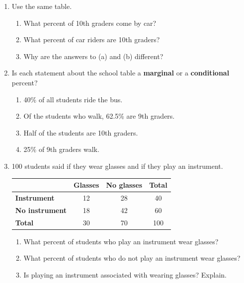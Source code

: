 \documentclass[11pt]{article}
\begin{document}
\begin{enumerate}
\item Use the same table.
\begin{enumerate}[itemsep=1.4em]
  \item What percent of 10th graders come by car? 
  \item What percent of car riders are 10th graders? 
  \item Why are the answers to (a) and (b) different?

\end{enumerate}

\newpage
\item Is each statement about the school table a \textbf{marginal} or a \textbf{conditional} percent?
\begin{enumerate}[itemsep=1.4em]
  \item 40\% of all students ride the bus. 
  \item Of the students who walk, 62.5\% are 9th graders. 
  \item Half of the students are 10th graders. 
  \item 25\% of 9th graders walk. 
\end{enumerate}
\work{1.5em}

\item 100 students said if they wear glasses and if they play an instrument.

\begin{center}
\renewcommand{\arraystretch}{1.4}
\begin{tabular}{|l|c|c|c|}\hline
 & \textbf{Glasses} & \textbf{No glasses} & \textbf{Total} \\ \hline
\textbf{Instrument} & 12 & 28 & 40 \\ \hline
\textbf{No instrument} & 18 & 42 & 60 \\ \hline
\textbf{Total} & 30 & 70 & 100 \\ \hline
\end{tabular}
\end{center}
\begin{enumerate}[itemsep=1em]
  \item What percent of students who play an instrument wear glasses? 
  \item What percent of students who do not play an instrument wear glasses? 
  \item Is playing an instrument associated with wearing glasses? Explain.


\end{enumerate}
\end{enumerate}
\end{document}
